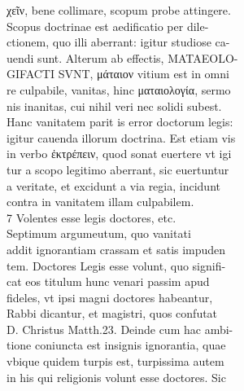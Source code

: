 \documentclass{article}
\begin{document}
\begin{pages}
                χεῖν, bene collimare, scopum probe attingere. \\
                Scopus doctrinae est aedificatio per dile- \\
                ctionem, quo illi aberrant: igitur studiose ca- \\
                uendi sunt. Alterum ab effectis, MATAEOLO- \\
                GIFACTI SVNT, μάταιον vitium est in omni \\
                re culpabile, vanitas, hinc ματαιολογία, sermo \\
                nis inanitas, cui nihil veri nec solidi subest. \\
                Hanc vanitatem parit is error doctorum legis: \\
                igitur cauenda illorum doctrina. Est etiam vis \\
                in verbo ἐκτρέπειν, quod sonat euertere vt igi \\
                tur a scopo legitimo aberrant, sic euertuntur \\
                a veritate, et excidunt a via regia, incidunt \\
                contra in vanitatem illam culpabilem. \\
                7 Volentes esse legis doctores, etc. \\
                Septimum argumeutum, quo vanitati \\
                addit ignorantiam crassam et satis impuden \\
                tem. Doctores Legis esse volunt, quo signifi- \\
                cat eos titulum hunc venari passim apud \\
                fideles, vt ipsi magni doctores habeantur, \\
                Rabbi dicantur, et magistri, quos confutat \\
                D. Christus Matth.23. Deinde cum hac ambi- \\
                tione coniuncta est insignis ignorantia, quae \\
                vbique quidem turpis est, turpissima autem \\
                in his qui religionis volunt esse doctores. Sic \\

\end{pages}
\end{document}
